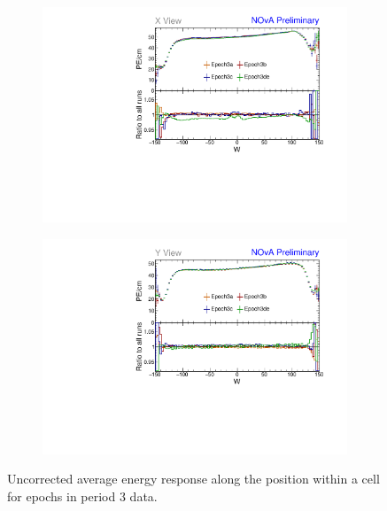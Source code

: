 \begin{figure}[hbtp]
\centering
\begin{subfigure}[b]{0.495\textwidth}
\centering
\includegraphics[width=\textwidth]{Plots/TBCalibration/Attenprofs_P3Data_WPE_corr_xy_X_Combined.pdf}
\end{subfigure}
\begin{subfigure}[b]{0.495\textwidth}
\centering
\includegraphics[width=\textwidth]{Plots/TBCalibration/Attenprofs_P3Data_WPE_corr_xy_Y_Combined.pdf}
\end{subfigure}
\caption{Uncorrected average energy response along the position within a cell for epochs in period 3 data.}
\label{fig:CalibhistWPE_period3}
\end{figure}

